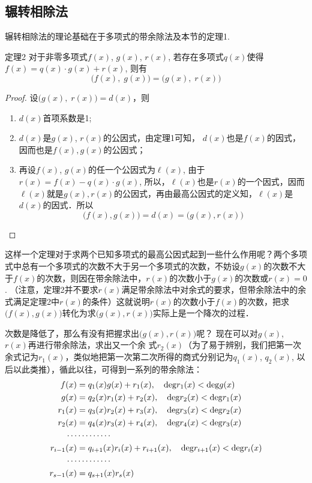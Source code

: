 \subsection{辗转相除法}

辗转相除法的理论基础在于多项式的带余除法及本节的定理1.

\begin{blk}{定理2}
    对于非零多项式$f(x)$, $g(x)$, $r(x)$, 若存在多项式$q(x)$使得$f(x)=q(x)\cdot g(x)+r(x)$, 则有
    \[\big(f(x),\; g(x)\big)=\big(g(x),\; r(x)\big)\]
\end{blk}

\begin{proof}
设$\big(g(x),\; r(x)\big)=d(x)$，则
\begin{enumerate}
\item $d(x)$首项系数是1;
\item $d(x)$是$g(x)$, $r(x)$的公因式，由定理1可知，
$d(x)$也是$f(x)$的因式，因而也是$f(x),g(x)$的公因式；    
\item 再设$f(x)$, $g(x)$的任一个公因式为$\ell(x)$, 由于$r(x)=f(x)-q(x)\cdot g(x)$, 所以，$\ell(x)$也是$r(x)$的一个因式，因而$\ell(x)$就是$g(x),r(x)$的公因式，再由最高公因式的定义知，$\ell(x)$是$d(x)$的因式．所以
\[\big(f (x) ,g (x) \big) =d (x) = \big(g (x) ,r (x) \big)\]
\end{enumerate}
\end{proof}

这样一个定理对于求两个已知多项式的最高公因式起到一些什么作用呢？两个多项式中总有一个多项式的次数不大于另一个多项式的次数，不妨设$g(x)$的次数不大于$f(x)$的次数，则因在带余除法中，$r(x)$的次数小于$g(x)$的次数或$r(x)=0$. （注意，定理2并不要求$r(x)$满足带余除法中对余式的要求，但带余除法中的余式满足定理2中$r(x)$的条件）这就说明$r(x)$的次数小于$f(x)$的次数，把求$\big(f(x), g(x)\big)$转化为求$\big(g(x), r(x)\big)$实际上是一个降次的过程．

次数是降低了，那么有没有把握求出$\big(g(x),r(x)\big)$呢？
现在可以对$g(x)$, $r(x)$再进行带余除法，求出又一个余
式$r_2(x)$（为了易于辨别，我们把第一次余式记为$r_1(x)$，类似地把第一次第二次所得的商式分别记为$q_1(x)$, $q_2(x)$, 以后以此类推），循此以往，可得到一系列的带余除法：
\begin{equation}
    \begin{split}
f(x)&=q_1(x)g(x)+r_1(x),\quad {\rm deg}r_1(x)<{\rm deg}g(x)\\
g(x)&=q_2(x)r_1(x)+r_2(x),\quad {\rm deg}r_2(x)<{\rm deg}r_1(x)\\
r_1(x)&=q_3(x)r_2(x)+r_3(x),\quad {\rm deg}r_3(x)<{\rm deg}r_2(x)\\
r_2(x)&=q_4(x)r_3(x)+r_4(x),\quad {\rm deg}r_4(x)<{\rm deg}r_3(x)\\
\cdots &\cdots \cdots \cdots \\
r_{i-1}(x)&=q_{i+1}(x)r_i(x)+r_{i+1}(x),\quad {\rm deg}r_{i+1}(x)<{\rm deg}r_i(x)\\
\cdots &\cdots \cdots \cdots \\
r_{s-1}(x)&=q_{s+1}(x)r_s(x)
\end{split}
\end{equation}

